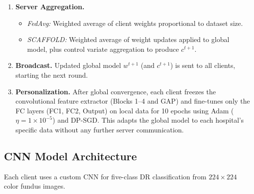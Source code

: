 \documentclass[12pt, a4paper]{article}
\begin{document}
\begin{enumerate}[leftmargin=*, label=\textbf{Step \arabic*.}]
\item \textbf{Server Aggregation.}
\begin{itemize}
  \item \textit{FedAvg:} Weighted average of client weights proportional to dataset size.
  \item \textit{SCAFFOLD:} Weighted average of weight updates applied to global model, plus control variate aggregation to produce $c^{t+1}$.
\end{itemize}

\item \textbf{Broadcast.}
Updated global model $w^{t+1}$ (and $c^{t+1}$) is sent to all clients, starting the next round.

\item \textbf{Personalization.}
After global convergence, each client freezes the convolutional feature extractor (Blocks 1--4 and GAP) and fine-tunes only the FC layers (FC1, FC2, Output) on local data for 10 epochs using Adam ($\eta = 1\times10^{-5}$) and DP-SGD. This adapts the global model to each hospital's specific data without any further server communication.

\end{enumerate}

\subsection{CNN Model Architecture}

Each client uses a custom CNN for five-class DR classification from $224 \times 224$ color fundus images.
\end{document}
